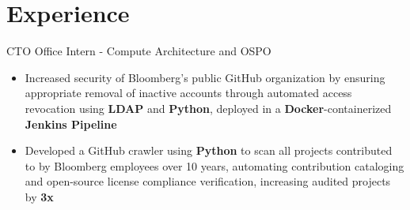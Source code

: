 \documentclass[letterpaper,11pt]{article}
\begin{document}
\section{Experience}
{CTO Office Intern - Compute Architecture and OSPO}{}
\begin{itemize}[leftmargin=*]
    \item \vspace{-3pt} \small Increased security of Bloomberg's public GitHub
          organization by ensuring appropriate removal of inactive accounts
          through automated access revocation using \textbf{LDAP} and
          \textbf{Python}, deployed in a \textbf{Docker}-containerized
          \textbf{Jenkins Pipeline}
    \item \vspace{-7pt} \small Developed a GitHub crawler using \textbf{Python}
          to scan
          all projects contributed to by Bloomberg employees over 10 years,
          automating contribution cataloging and
          open-source license compliance verification,
          increasing audited projects by \textbf{3x}
\end{itemize}
\end{document}

